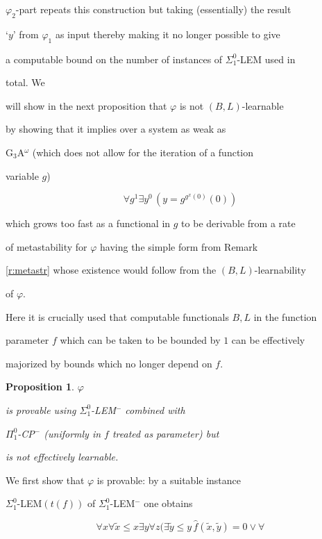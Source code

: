 \documentclass[1p]{elsarticle}
\theoremstyle{plain}
\newtheorem{prop}[thm]{Proposition}
\theoremstyle{definition}
\theoremstyle{remark}
\renewenvironment{proof}[1][]{\noindent{\bf Proof{#1}. }}{\nopagebreak[4]{\hspace*{\fill}


  $\Box$              %

 }{\vspace{2ex}}}
\theoremstyle{definition}
\begin{document}
{$\varphi_2$-part repeats this construction but taking (essentially) the result 

`$y$' from $\varphi_1$ as input thereby making it no longer possible to give 

a computable bound on the number of instances of $\Sigma^0_1$-LEM used in 

total. We 

will show in the next proposition that $\varphi$ is not $(B,L)$-learnable 

by showing that it implies over a system as weak as 

G$_3$A$^{\omega}$ (which does not allow for the iteration of a function 

variable $g$) 

\[ \forall g^1\exists y^0 \,(y=g^{g^x(0)}(0)) \] 

which grows too fast as a functional in $g$ to be derivable from a rate 

of metastability for $\varphi$ having the simple form from Remark 

\ref{r:metastr} whose existence would follow from the $(B,L)$-learnability 

of $\varphi.$  

Here it is crucially used that computable functionals $B,L$ in the function 

parameter $f$ which can be taken to be bounded by $1$ can be effectively 

majorized by bounds which no longer depend on $f.$



\begin{prop}\label{p:nonLearnablePhi} $\varphi$  

is provable using {\rm $\Sigma^0_1$-LEM$^-$} combined with 

{\rm $\Pi^0_1$-CP$^-$} (uniformly in $f$ treated as parameter) but  

is not effectively learnable.

\end{prop}

\begin{proof}

We first show that $\varphi$ is provable: by a suitable instance 

$\Sigma^0_1$-LEM$(t(f))$ of $\Sigma^0_1$-LEM$^-$ one obtains 

\[ \forall x\forall \tilde{x}\le x\exists y\forall z \big( 

\exists \tilde{y}\le y\,\widehat{f}(\tilde{x},\tilde{y})=0 \vee \forall 

\]
\end{proof}}
\end{document}
